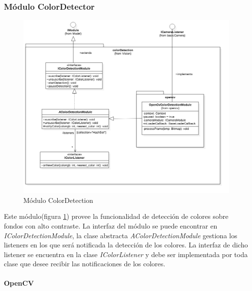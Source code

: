 \subsubsection{Módulo ColorDetector}
\begin{figure}
	\centering
	\includegraphics[width=1\linewidth]{imagenes/diagramas/ColorDetectionModule.png}
	\caption{Módulo ColorDetection}
	\label{fig:color-detection-module}
\end{figure}
Este módulo(figura \ref{fig:color-detection-module}) provee la funcionalidad de detección de colores sobre fondos con alto contraste. La interfaz del módulo se puede encontrar en \textit{IColorDetectionModule}, la clase abstracta \textit{AColorDetectionModule} gestiona los listeners en los que será notificada la detección de los colores. La interfaz de dicho listener se encuentra en la clase \textit{IColorListener} y debe ser implementada por toda clase que desee recibir las notificaciones de los colores.

\paragraph{OpenCV}

